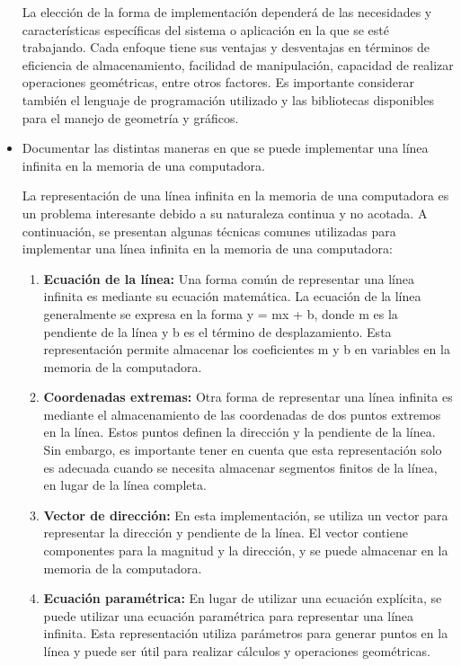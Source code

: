 \documentclass{article}
\begin{document}
\begin{itemize}
  La elección de la forma de implementación dependerá de las necesidades y características específicas del sistema o aplicación en la que se esté trabajando. Cada enfoque tiene sus ventajas y desventajas en términos de eficiencia de almacenamiento, facilidad de manipulación, capacidad de realizar operaciones geométricas, entre otros factores. Es importante considerar también el lenguaje de programación utilizado y las bibliotecas disponibles para el manejo de geometría y gráficos.
  
\item Documentar las distintas maneras en que se puede implementar una línea infinita en la memoria de una computadora.

  La representación de una línea infinita en la memoria de una computadora es un problema interesante debido a su naturaleza continua y no acotada. A continuación, se presentan algunas técnicas comunes utilizadas para implementar una línea infinita en la memoria de una computadora:

  \begin{enumerate}
  \item \textbf{Ecuación de la línea:} Una forma común de representar una línea infinita es mediante su ecuación matemática. La ecuación de la línea generalmente se expresa en la forma y = mx + b, donde m es la pendiente de la línea y b es el término de desplazamiento. Esta representación permite almacenar los coeficientes m y b en variables en la memoria de la computadora.
    
  \item \textbf{Coordenadas extremas:} Otra forma de representar una línea infinita es mediante el almacenamiento de las coordenadas de dos puntos extremos en la línea. Estos puntos definen la dirección y la pendiente de la línea. Sin embargo, es importante tener en cuenta que esta representación solo es adecuada cuando se necesita almacenar segmentos finitos de la línea, en lugar de la línea completa.

  \item \textbf{Vector de dirección:} En esta implementación, se utiliza un vector para representar la dirección y pendiente de la línea. El vector contiene componentes para la magnitud y la dirección, y se puede almacenar en la memoria de la computadora.

  \item \textbf{Ecuación paramétrica:} En lugar de utilizar una ecuación explícita, se puede utilizar una ecuación paramétrica para representar una línea infinita. Esta representación utiliza parámetros para generar puntos en la línea y puede ser útil para realizar cálculos y operaciones geométricas.


\end{enumerate}
\end{itemize}
\end{document}
